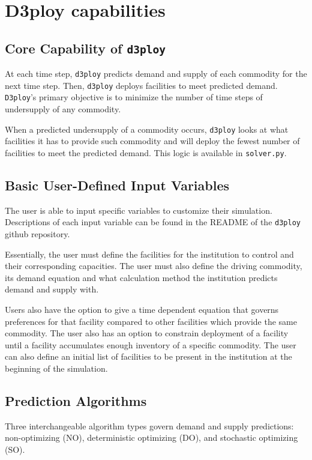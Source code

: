 \documentclass[11pt,letterpaper]{article}
\newcommand{\deploy}{\texttt{d3ploy}\xspace}%
\newcommand{\Deploy}{\texttt{D3ploy}\xspace}%
\begin{document}
\section{D3ploy capabilities}
\subsection{\textbf{Core Capability of \deploy}}
At each time step, \deploy predicts demand and supply of each 
commodity for the next time step.
Then, \deploy deploys facilities to meet predicted demand. 
\Deploy's primary objective is to minimize the number of time 
steps of undersupply of any commodity. 

When a predicted undersupply of a commodity occurs, \deploy looks 
at what facilities it has to provide such commodity and 
will deploy the fewest number of facilities
to meet the predicted demand. 
This logic is available in \texttt{solver.py}. 

\subsection{\textbf{Basic User-Defined Input Variables}}
The user is able to input specific variables to customize their
simulation. 
Descriptions of each input variable can be found in the 
README of the \deploy github repository.

Essentially, the user must define the facilities for the 
institution to control and their corresponding capacities. 
The user must also define the driving commodity, its demand 
equation and what calculation method the institution predicts 
demand and supply with. 

Users also have the option to give a time dependent equation that governs
preferences for that facility compared to other facilities which 
provide the same commodity. 
The user also has an option to constrain deployment of a facility 
until a facility accumulates enough inventory of a specific commodity.
The user can also define an initial list of facilities to 
be present in the institution at the beginning of the simulation. 

\subsection{\textbf{Prediction Algorithms}}
Three interchangeable algorithm types govern demand and supply 
predictions: non-optimizing (NO), deterministic optimizing (DO), and stochastic
optimizing (SO). 
\end{document}
